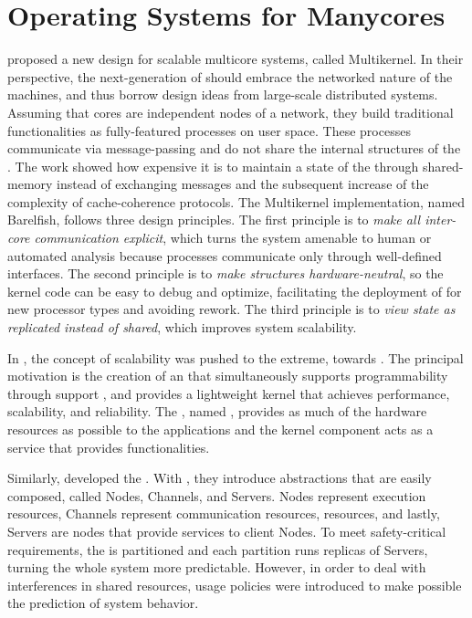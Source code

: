 \section{Operating Systems for Manycores}
\label{sec.works.os}

	 proposed a new \os design for scalable multicore
	systems, called Multikernel.
	In their perspective, the next-generation of \oss should embrace the networked nature
	of the machines, and thus borrow design ideas from large-scale distributed
	systems.
	Assuming that cores are independent nodes of a network, they build traditional
	\os functionalities as fully-featured processes on user space.
	These processes communicate via message-passing and do not share the internal
	structures of the \os.
	The work showed how expensive it is to maintain a state of the \os through
	shared-memory instead of exchanging messages and the subsequent increase of
	the complexity of cache-coherence protocols.
	The Multikernel implementation, named Barelfish, follows three design principles.
	The first principle is to \textit{make all inter-core communication explicit}, which turns the system
	amenable to human or automated analysis because processes communicate only
	through well-defined interfaces.
	The second principle is to \textit{make \os structures hardware-neutral}, so the kernel
	code can be easy to debug and optimize, facilitating the deployment of \os for new
	processor types and avoiding rework.
	The third principle is to \textit{view \os state as replicated instead of shared}, which improves system
	scalability.

	In , the concept of scalability was pushed
	to the extreme, towards \hpc.
	The principal motivation is the creation of an \os that simultaneously supports
	programmability through support \linux \api, and provides a lightweight kernel
	that achieves performance, scalability, and reliability.
	The \os, named \mos, provides as much of the hardware resources as
	possible to the \hpc applications and the \linux kernel component
	acts as a service that provides \linux functionalities.

	Similarly,  developed the \moosca.
	With \moosca, they introduce abstractions that are easily composed, called Nodes,
	Channels, and Servers. Nodes represent execution resources, Channels represent communication
	resources, \eg \noc resources, and lastly, Servers are nodes that provide
	services to client Nodes.
	To meet safety-critical requirements, the \manycore is partitioned and each partition
	runs replicas of Servers, turning the whole system more predictable.
	However, in order to deal with interferences in shared resources,
	usage policies were introduced to make possible the prediction of system behavior.

